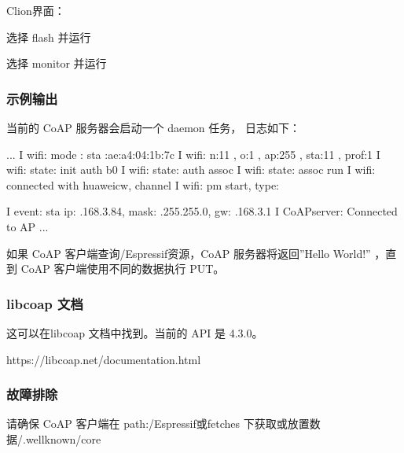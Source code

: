 \documentclass[a4paper,12pt,english]{sphinxmanual}
\begin{document}
{{\sphinxAtStartPar
Clion界面：

\sphinxAtStartPar
选择 flash 并运行

\sphinxAtStartPar
选择 monitor 并运行


\subsubsection{示例输出}
\label{\detokenize{exp-esp32/coap:id11}}
\sphinxAtStartPar
当前的 CoAP 服务器会启动一个 daemon 任务，
日志如下：

\begin{sphinxVerbatim}[commandchars=\\\{\}]
...
I  wifi: mode : sta :ae:a4:04:1b:7c
I  wifi: n:11 , o:1 , ap:255 , sta:11 , prof:1
I  wifi: state: init \PYGZhy{}\PYGZgt{} auth b0
I  wifi: state: auth \PYGZhy{}\PYGZgt{} assoc 
I  wifi: state: assoc \PYGZhy{}\PYGZgt{} run 
I  wifi: connected with huawei\PYGZus{}cw, channel 
I  wifi: pm start, type: 

I  event: sta ip: .168.3.84, mask: .255.255.0, gw: .168.3.1
I  CoAP\PYGZus{}server: Connected to AP
...
\end{sphinxVerbatim}

\sphinxAtStartPar
如果 CoAP 客户端查询/Espressif资源，CoAP 服务器将返回”Hello World!”
，直到 CoAP 客户端使用不同的数据执行 PUT。


\subsubsection{libcoap 文档}
\label{\detokenize{exp-esp32/coap:id12}}
\sphinxAtStartPar
这可以在libcoap 文档中找到。当前的 API 是 4.3.0。

\sphinxAtStartPar
https://libcoap.net/documentation.html


\subsubsection{故障排除}
\label{\detokenize{exp-esp32/coap:id13}}
\sphinxAtStartPar
请确保 CoAP 客户端在 path:/Espressif或fetches 下获取或放置数据/.well\sphinxhyphen{}known/core

}}
\end{document}
